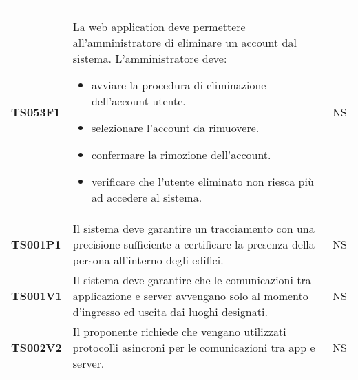 \documentclass[../piano-di-qualifica.tex]{subfiles}
\begin{document}
\begin{centering}
\begin{longtable}[H]{>{\centering\bfseries}m{3cm} >{}p{10cm} >{\centering\arraybackslash}m{3cm}}
    TS053F1            & La web application deve permettere all'amministratore di eliminare un account dal sistema. \newline
    L'amministratore deve:
    \begin{itemize}
      \item avviare la procedura di eliminazione dell'account utente.
      \item selezionare l'account da rimuovere.
      \item confermare la rimozione dell'account.
      \item verificare che l'utente eliminato non riesca più ad accedere al sistema.
    \end{itemize}
                       & NS                                                                                                                                                                                                                                                               \\


    TS001P1            & Il sistema deve garantire un tracciamento con una precisione sufficiente a certificare la presenza della persona all’interno degli edifici. \newline
                       & NS                                                                                                                                                                                                                                                               \\

    TS001V1            & Il sistema deve garantire che le comunicazioni tra applicazione e server avvengano solo al momento d’ingresso ed uscita dai luoghi designati. \newline
                       & NS                                                                                                                                                                                                                                                               \\

    TS002V2            & Il proponente richiede che vengano utilizzati protocolli asincroni per le comunicazioni tra app e server. \newline
                       & NS                                                                                                                                                                                                                                                               \\


\end{longtable}
\end{centering}
\end{document}
